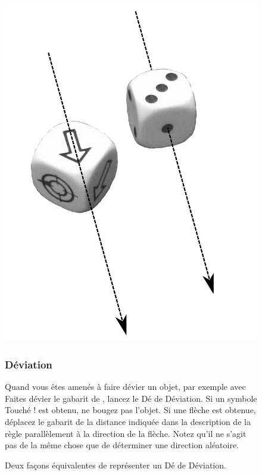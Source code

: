 \begin{figure}[!htbp]
\begin{minipage}[c]{0.3\textwidth}
\includegraphics[width=\textwidth]{pics/deviation_dice.png}
\caption{Deux façons équivalentes de représenter un Dé de Déviation.}
\label{figure/deviation_dice}
\end{minipage}\hfill
\begin{minipage}[c]{0.67\textwidth}
\subsubsection{Déviation}

Quand vous êtes amenés à faire dévier un objet, par exemple avec \og Faites dévier le gabarit de  \fg{}, lancez le Dé de Déviation. Si un symbole \og Touché ! \fg{} est obtenu, ne bougez pas l'objet. Si une flèche est obtenue, déplacez le gabarit de la distance indiquée dans la description de la règle parallèlement à la direction de la flèche. Notez qu'il ne s'agit pas de la même chose que de déterminer une direction aléatoire.


\end{minipage}
\end{figure}
